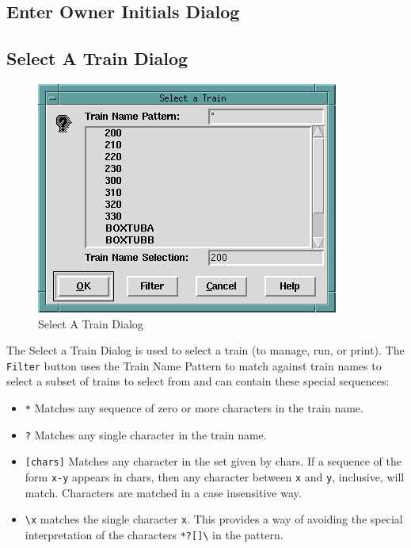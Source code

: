 \subsection{Enter Owner Initials Dialog}

\subsection{Select A Train Dialog}
\label{sect:fcf:selecttraindialog}

\begin{figure}[hbpt]
\begin{centering}
\includegraphics{FCFSelectATrainDialog.png}
\caption{Select A Train Dialog}
\label{fig:fcf:selecttraindialog}
\end{centering}
\end{figure}
The Select a Train Dialog is used to select a train (to manage, run, or
print). The \verb=Filter= button uses the Train Name Pattern to match
against train names to select a subset of trains to select from and can
contain these special sequences:  
\begin{itemize} 
\item \verb=*= Matches any sequence of zero or more characters in the
train name.
\item \verb=?= Matches any single character in the train name. 
\item \verb=[chars]= Matches any character in the set given by chars. 
If a sequence of the form \verb=x-y= appears in chars, then any
character between \verb=x= and  \verb=y=,  inclusive,  will match.
Characters are matched in a case insensitive way. 
\item \verb=\x= matches the single character \verb=x=. This provides a 
way of avoiding the special interpretation of the characters
\verb=*?[]\= in the pattern.
\end{itemize}

